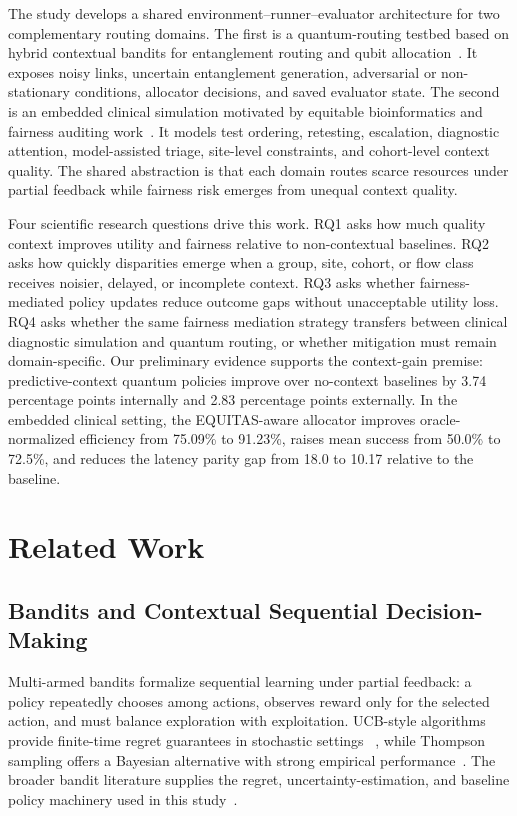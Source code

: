 \documentclass[conference]{IEEEtran}
\begin{document}
The study develops a shared environment--runner--evaluator architecture for
two complementary routing domains. The first is a quantum-routing testbed
based on hybrid contextual bandits for entanglement routing and qubit
allocation~\cite{garcia2026threat_aware_quantum_routing}. It exposes noisy
links, uncertain entanglement generation, adversarial or non-stationary
conditions, allocator decisions, and saved evaluator state. The second is an
embedded clinical simulation motivated by equitable bioinformatics and
fairness auditing work~\cite{garcia2025equitable_bioinformatics}. It models
test ordering, retesting, escalation, diagnostic attention, model-assisted
triage, site-level constraints, and cohort-level context quality. The shared
abstraction is that each domain routes scarce resources under partial feedback
while fairness risk emerges from unequal context quality.

Four scientific research questions drive this work. RQ1 asks how much quality
context improves utility and fairness relative to non-contextual baselines.
RQ2 asks how quickly disparities emerge when a group, site, cohort, or flow
class receives noisier, delayed, or incomplete context. RQ3 asks whether
fairness-mediated policy updates reduce outcome gaps without unacceptable
utility loss. RQ4 asks whether the same fairness mediation strategy transfers
between clinical diagnostic simulation and quantum routing, or whether
mitigation must remain domain-specific. Our preliminary evidence supports the
context-gain premise: predictive-context quantum policies improve over
no-context baselines by 3.74 percentage points internally and 2.83 percentage
points externally. In the embedded clinical setting, the EQUITAS-aware
allocator improves oracle-normalized efficiency from 75.09\% to 91.23\%,
raises mean success from 50.0\% to 72.5\%, and reduces the latency parity gap
from 18.0 to 10.17 relative to the baseline.

\section{Related Work}
\subsection{Bandits and Contextual Sequential Decision-Making}
Multi-armed bandits formalize sequential learning under partial feedback:
a policy repeatedly chooses among actions, observes reward only for the
selected action, and must balance exploration with exploitation. UCB-style
algorithms provide finite-time regret guarantees in stochastic settings
~\cite{auer2002finite}, while Thompson sampling offers a Bayesian alternative
with strong empirical performance~\cite{russo2018tutorial}. The broader
bandit literature supplies the regret, uncertainty-estimation, and baseline
policy machinery used in this study~\cite{lattimore2020bandit}.
\end{document}
